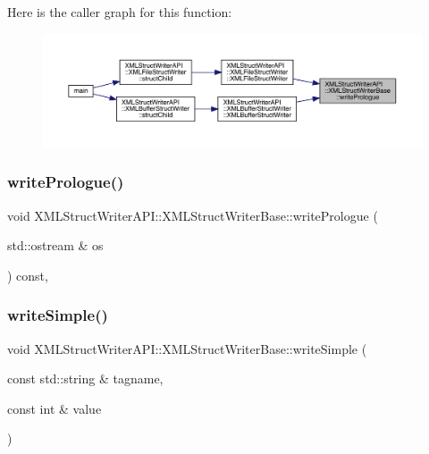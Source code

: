 Here is the caller graph for this function\+:
\nopagebreak
\begin{figure}[H]
\begin{center}
\leavevmode
\includegraphics[width=350pt]{db/d4f/classXMLStructWriterAPI_1_1XMLStructWriterBase_a7b8ba2adefb35aa0a0588869b7cca47e_icgraph}
\end{center}
\end{figure}
\mbox{\label{classXMLStructWriterAPI_1_1XMLStructWriterBase_a7b8ba2adefb35aa0a0588869b7cca47e}} 
\subsubsection{\texorpdfstring{writePrologue()}{writePrologue()}\hspace{0.1cm}{\footnotesize\ttfamily [3/3]}}
{\footnotesize\ttfamily void X\+M\+L\+Struct\+Writer\+A\+P\+I\+::\+X\+M\+L\+Struct\+Writer\+Base\+::write\+Prologue (\begin{DoxyParamCaption}\item[{std\+::ostream \&}]{os }\end{DoxyParamCaption}) const\hspace{0.3cm}{\ttfamily [inline]}, {\ttfamily [protected]}}

\mbox{\label{classXMLStructWriterAPI_1_1XMLStructWriterBase_a53065b03f0749669f9ed62f6e0875fa4}} 
\subsubsection{\texorpdfstring{writeSimple()}{writeSimple()}\hspace{0.1cm}{\footnotesize\ttfamily [1/12]}}
{\footnotesize\ttfamily void X\+M\+L\+Struct\+Writer\+A\+P\+I\+::\+X\+M\+L\+Struct\+Writer\+Base\+::write\+Simple (\begin{DoxyParamCaption}\item[{const std\+::string \&}]{tagname,  }\item[{const int \&}]{value }\end{DoxyParamCaption})\hspace{0.3cm}{\ttfamily [inline]}}

